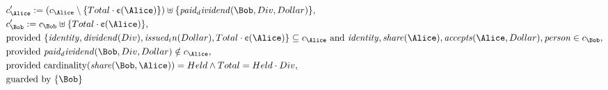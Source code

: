 \begin{align*}
&
c'_
{
\Alice
}
 := 
(c_
{
\Alice
}
 \setminus 
\{
Total
\cdot
\text{\textcent}
(
\Alice
)
\}
) \uplus 
\{
\mathit{
paid_dividend
}
(
\Bob
,
Div
,
Dollar
)
\}
,\\
&
c'_
{
\Bob
}
 := 
c_
{
\Bob
}
 \uplus 
\{
Total
\cdot
\text{\textcent}
(
\Alice
)
\}
,\\
&
\text{provided } 
\{
\mathit{
identity
}
,
\mathit{
dividend
}
(
Div
)
,
\mathit{
issued_in
}
(
Dollar
)
,
Total
\cdot
\text{\textcent}
(
\Alice
)
\}
 \subseteq c_
{
\Alice
}
 \text{ and } 
\mathit{
identity
}
,
\mathit{
share
}
(
\Alice
)
,
\mathit{
accepts
}
(
\Alice
,
Dollar
)
,
\mathit{
person
}
 \in c_
{
\Bob
}
,\\
&
\text{provided } 
\mathit{
paid_dividend
}
(
\Bob
,
Div
,
Dollar
)
 \notin c_
{
\Alice
}
,\\
&
\text{provided } 
\mathrm{cardinality}(
\mathit{
share
}
(
\Bob
,
\Alice
)
)
=
Held
\land
Total
=
Held
\cdot
Div
,\\
&
\text{guarded by } \{
\Bob
\}
\end{align*}
